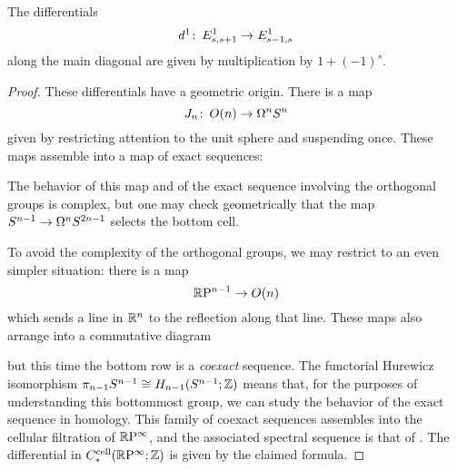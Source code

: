 \begin{lemma}
The differentials \[d^1\colon\thinspace E^1_{s,s+1} \to E^1_{s-1,s}\] along the main diagonal are given by multiplication by $1 + (-1)^s$.
\end{lemma}
\begin{proof}
These differentials have a geometric origin.
There is a map \[J_n\colon\thinspace O(n) \to \Omega^n S^n\] given by restricting attention to the unit sphere and suspending once.
These maps assemble into a map of exact sequences:
\begin{center}
\end{center}
The behavior of this map and of the exact sequence involving the orthogonal groups is complex, but one may check geometrically that the map $S^{n-1} \to \Omega^n S^{2n-1}$ selects the bottom cell.

To avoid the complexity of the orthogonal groups, we may restrict to an even simpler situation: there is a map \[\mathbb R \mathrm{P}^{n-1} \to O(n)\] which sends a line in $\mathbb R^n$ to the reflection along that line.
These maps also arrange into a commutative diagram
\begin{center}
\end{center}
but this time the bottom row is a \emph{coexact} sequence.
The functorial Hurewicz isomorphism $\pi_{n-1} S^{n-1} \cong H_{n-1}(S^{n-1}; \mathbb Z)$ means that, for the purposes of understanding this bottommost group, we can study the behavior of the exact sequence in homology.
This family of coexact sequences assembles into the cellular filtration of $\mathbb R \mathrm{P}^\infty$, and the associated spectral sequence is that of .
The differential in $C^{\mathrm{cell}}_*(\mathbb R \mathrm{P}^\infty; \mathbb Z)$ is given by the claimed formula.
\end{proof}

